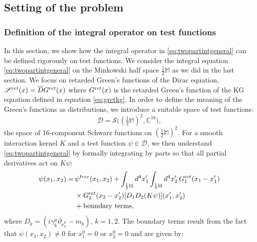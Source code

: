 \documentclass[b5paper,draft,openbib,12pt]{memoir}
\newcommand{\CC}{\mathbb{C}}
\newcommand{\M}{\mathbb{M}}
\newcommand{\ret}{{\textup ret}}
\newcommand{\free}{{\textup free}}
\begin{document}


\subsection{Setting of the problem} \label{sec:setting}

\subsubsection{Definition of the integral operator on test functions} \label{sec:aontestfunctions}

In this section, we show how the integral operator in 
\eqref{eq:twopartintgeneral} can be defined rigorously on 
test functions.
We consider the integral equation \eqref{eq:twopartintgeneral} 
on the Minkowski half space $\frac{1}{2}\M$ as we did in the last section.
We focus on retarded Green's functions of the Dirac equation, 
$\mathscr{S}^\ret(x) = \overline{D} G^\ret(x)$ where 
$G^\ret(x)$ is the retarded Green's function of the KG equation defined 
in equation \eqref{eq:gretkg}.
In order to define the meaning of the Green's functions as distributions, we introduce a suitable space of test functions:
\begin{equation}
	\mathscr{D} = \mathcal{S}\big( (\tfrac{1}{2}\M)^2,\CC^{16} \big),
\end{equation}
the space of 16-component Schwarz functions on $(\tfrac{1}{2}\M)^2$.
For a smooth interaction kernel $K$ and a test function $\psi \in \mathscr{D}$, we then understand \eqref{eq:twopartintgeneral} by formally integrating by parts so that all partial derivatives act on $K \psi$:
\begin{align}
  \psi(x_1,x_2) =\, &\psi^\free(x_1,x_2) +\int_{\frac{1}{2}\M} d^4 x_1' \int_{\frac{1}{2}\M} d^4 x_2' \, G_1^\ret(x_1-x_1')\\
  & \times G_2^\ret(x_2-x_2') [D_1 D_2(K \psi)](x_1',x_2')\nonumber\\
&+\text{boundary terms},
\label{eq:inteqpi}
\end{align}
where $D_k = (i \gamma_k^\mu \partial_{x_k^\mu} - m_k)$, $k=1,2$. The boundary terms result from the fact that $\psi(x_1,x_2) \neq 0$ for $x_1^0 = 0$ or $x_2^0 =0$ and are given by:
\end{document}

